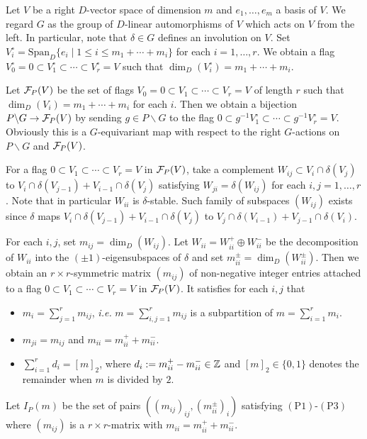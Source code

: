 \documentclass[11pt,letterpaper]{amsart}
\theoremstyle{plain}
\numberwithin{equation}{section}
\begin{document}
Let $V$ be a right $D$-vector space of dimension $m$ and $e_1,  \ldots,  e_m$ a basis of $V$.
We regard $G$ as the group of $D$-linear automorphisms of $V$ which acts on $V$ from the left.
In particular,  note that $\delta\in G$ defines an involution on $V$.
Set $V_i^\circ=\mathrm{Span}_D\{e_i \mid 1\leq i \leq m_1+\cdots+m_i\}$ for each $i=1,  \ldots,  r$.
We obtain a flag $V_0^\circ=0\subset V_1^\circ \subset \cdots \subset V_r^\circ=V$ such that $\dim_D(V_i^\circ)=m_1+\cdots+m_i$.

Let ${\mathcal {F}}_P(V)$ be the set of flags $V_0=0\subset V_1 \subset \cdots \subset V_r=V$ of length $r$ such that $\dim_D(V_i)=m_1+\cdots+m_i$ for each $i$.
Then we obtain a bijection $P\backslash G\to {\mathcal {F}}_P(V)$ by sending $g\in P\backslash G$ to the flag $0\subset g^{-1}V_1^\circ \subset \cdots \subset g^{-1}V_r^\circ=V$.
Obviously this is a $G$-equivariant map with respect to the right $G$-actions on $P\backslash G$ and ${\mathcal {F}}_P(V)$.

For a flag $0\subset V_1 \subset \cdots \subset V_r=V$ in ${\mathcal {F}}_P(V)$,  take a complement $W_{ij}\subset V_i\cap \delta(V_j)$ to $V_i\cap\delta (V_{j-1})+V_{i-1}\cap\delta(V_j)$ satisfying $W_{ji}=\delta(W_{ij})$ for each $i,  j=1,  \ldots,  r$.
Note that in particular $W_{ii}$ is $\delta$-stable.
Such family of subspaces $(W_{ij})$ exists since $\delta$ maps $V_i\cap\delta(V_{j-1})+V_{i-1}\cap\delta(V_j)$ to $V_j\cap\delta(V_{i-1})+V_{j-1}\cap\delta(V_i)$.

For each $i,  j$,  set $m_{ij}=\dim_D(W_{ij})$.
Let $W_{ii}=W_{ii}^+\oplus W_{ii}^-$ be the decomposition of $W_{ii}$ into the $(\pm1)$-eigensubspaces of $\delta$ and set $m_{ii}^\pm=\dim_D(W_{ii}^\pm)$.
Then we obtain an $r\times r$-symmetric matrix $(m_{ij})$ of non-negative integer entries attached to a flag $0\subset V_1 \subset \cdots \subset V_r=V$ in ${\mathcal {F}}_P(V)$.
It satisfies for each $i,  j$ that  \setlength{\leftmargini}{25pt}
\begin{itemize}
\item[(P1):]   $m_i=\sum_{j=1}^r m_{ij}$,  \emph{i.e.} $m=\sum_{i, j=1}^r m_{ij}$ is a subpartition of $m=\sum_{i=1}^r m_i$.
\item[(P2):] $m_{ji}=m_{ij}$ and $m_{ii}=m_{ii}^+ +m_{ii}^-$.
\item[(P3):] $\sum_{i=1}^rd_i=[m]_2$, where $d_i:=m_{ii}^+-m_{ii}^-\in{\mathbb {Z}}$ and $[m]_2\in\{0,1\}$ denotes the remainder when $m$ is divided by $2$.
\end{itemize}
Let $I_P(m)$ be the set of 
pairs $((m_{ij})_{ij}, (m_{ii}^{\pm})_i)$ satisfying $(\mathrm{P}1)$-$(\mathrm{P}3)$ where $(m_{ij})$ is a $r\times r$-matrix with $m_{ii}=m_{ii}^+ + m_{ii}^-$.
\end{document}
